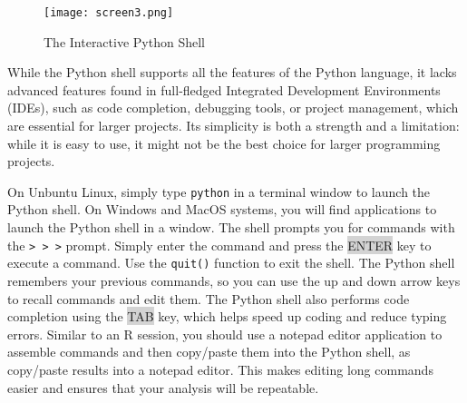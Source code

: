 \begin{figure}
\centering
\texttt{[image: screen3.png]}
\caption{The Interactive Python Shell}
\label{fig:pythonshell}
\end{figure}

While the Python shell supports all the features of the Python language, it lacks advanced features found in full-fledged Integrated Development Environments (IDEs), such as code completion, debugging tools, or project management, which are essential for larger projects. Its simplicity is both a strength and a limitation: while it is easy to use, it might not be the best choice for larger programming projects.

On Unbuntu Linux, simply type \texttt{python} in a terminal window to launch the Python shell. On Windows and MacOS systems, you will find applications to launch the Python shell in a window. The shell prompts you for commands with the \texttt{> > >} prompt. Simply enter the command and press the {\footnotesize\colorbox{lightgray}{ENTER}} key to execute a command. Use the \texttt{quit()} function to exit the shell. The Python shell remembers your previous commands, so you can use the up and down arrow keys to recall commands and edit them. The Python shell also performs code completion using the {\footnotesize\colorbox{lightgray}{TAB}} key, which helps speed up coding and reduce typing errors. Similar to an R session, you should use a notepad editor application to assemble commands and then copy/paste them into the Python shell, as copy/paste results into a notepad editor. This makes editing long commands easier and ensures that your analysis will be repeatable.

